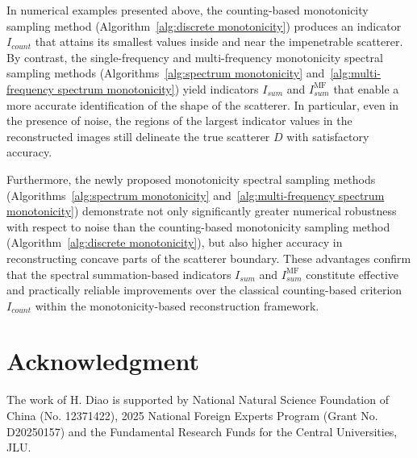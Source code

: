 \documentclass[11pt,reqno,twoside]{amsart}
\theoremstyle{definition}
\theoremstyle{remark}
\numberwithin{equation}{section}
\begin{document}
In numerical examples presented above, the counting-based monotonicity sampling method (Algorithm~\ref{alg:discrete monotonicity}) produces an indicator $I_{count}$ that attains its smallest values inside and near the impenetrable scatterer. By contrast, the single-frequency and multi-frequency monotonicity spectral sampling methods (Algorithms~\ref{alg:spectrum monotonicity} and~\ref{alg:multi-frequency spectrum monotonicity}) yield indicators $I_{sum}$ and $I_{sum}^{\mathrm{MF}}$ that enable a more accurate identification of the shape of the scatterer. In particular, even in the presence of noise, the regions of the largest indicator values in the reconstructed images still delineate the true scatterer $D$ with satisfactory accuracy.

Furthermore, the newly proposed monotonicity spectral sampling methods (Algorithms~\ref{alg:spectrum monotonicity} and~\ref{alg:multi-frequency spectrum monotonicity}) demonstrate not only significantly greater numerical robustness with respect to noise than the counting-based monotonicity sampling method (Algorithm~\ref{alg:discrete monotonicity}), but also higher accuracy in reconstructing concave parts of the scatterer boundary. These advantages confirm that the spectral summation-based indicators $I_{sum}$ and $I_{sum}^{\mathrm{MF}}$ constitute effective and practically reliable improvements over the classical counting-based criterion $I_{count}$ within the monotonicity-based reconstruction framework.


\section*{Acknowledgment}
The work of H. Diao is supported by National Natural Science Foundation of China  (No. 12371422), 2025 National Foreign Experts Program (Grant No. D20250157) and the Fundamental Research Funds for the Central Universities, JLU.  
\end{document}
